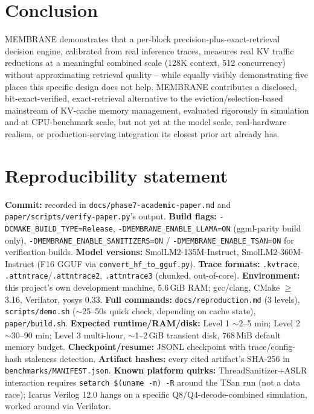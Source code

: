 \documentclass[11pt]{article}
\begin{document}
\section{Conclusion}

MEMBRANE demonstrates that a per-block precision-plus-exact-retrieval
decision engine, calibrated from real inference traces, measures real KV
traffic reductions at a meaningful combined scale (128K context, 512
concurrency) without approximating retrieval quality -- while equally
visibly demonstrating five places this specific design does not help.
MEMBRANE contributes a disclosed, bit-exact-verified, exact-retrieval
alternative to the eviction/selection-based mainstream of KV-cache
memory management, evaluated rigorously in simulation and at
CPU-benchmark scale, but not yet at the model scale, real-hardware
realism, or production-serving integration its closest prior art already
has.

\appendix
\section{Reproducibility statement}

\textbf{Commit:} recorded in \texttt{docs/phase7-academic-paper.md} and
\texttt{paper/scripts/verify-paper.py}'s output.
\textbf{Build flags:} \texttt{-DCMAKE\_BUILD\_TYPE=Release},
\texttt{-DMEMBRANE\_ENABLE\_LLAMA=ON} (ggml-parity build only),
\texttt{-DMEMBRANE\_ENABLE\_SANITIZERS=ON} / \texttt{-DMEMBRANE\_ENABLE\_TSAN=ON}
for verification builds.
\textbf{Model versions:} SmolLM2-135M-Instruct, SmolLM2-360M-Instruct
(F16 GGUF via \texttt{convert\_hf\_to\_gguf.py}).
\textbf{Trace formats:} \texttt{.kvtrace}, \texttt{.attntrace}/\texttt{.attntrace2},
\texttt{.attntrace3} (chunked, out-of-core).
\textbf{Environment:} this project's own development machine, 5.6\,GiB
RAM; gcc/clang, CMake $\geq$3.16, Verilator, yosys 0.33.
\textbf{Full commands:} \texttt{docs/reproduction.md} (3 levels),
\texttt{scripts/demo.sh} ($\sim$25--50s quick check, depending on cache state), \texttt{paper/build.sh}.
\textbf{Expected runtime/RAM/disk:} Level 1 $\sim$2--5 min; Level 2
$\sim$30--90 min; Level 3 multi-hour, $\sim$1--2\,GiB transient disk,
768\,MiB default memory budget.
\textbf{Checkpoint/resume:} JSONL checkpoint with trace/config-hash
staleness detection.
\textbf{Artifact hashes:} every cited artifact's SHA-256 in
\texttt{benchmarks/MANIFEST.json}.
\textbf{Known platform quirks:} ThreadSanitizer+ASLR interaction requires
\texttt{setarch \$(uname -m) -R} around the TSan run (not a data race);
Icarus Verilog 12.0 hangs on a specific Q8/Q4-decode-combined
simulation, worked around via Verilator.
\end{document}
